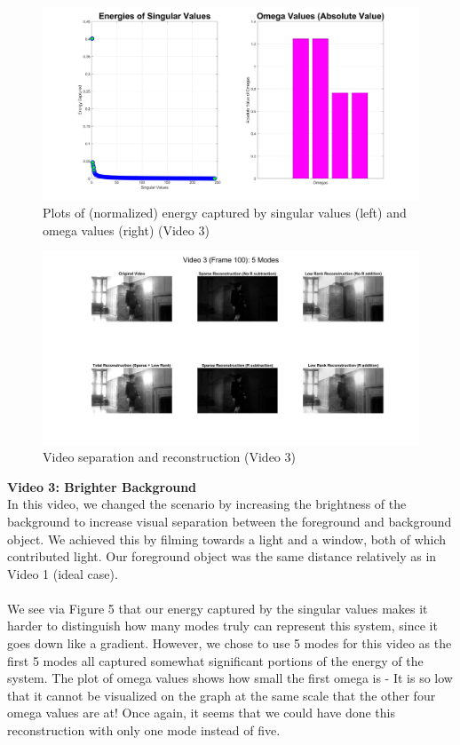 \documentclass{article}
\begin{document}
\begin{figure}[H]
\begin{center}
\includegraphics[width = 12cm]{energy3}
\caption{\label{fig:scaled_diss} Plots of (normalized) energy captured by singular values (left) and omega values (right) (Video 3)}
\end{center}
\end{figure}
\begin{figure}[H]
\begin{center}
\includegraphics[width = 16cm]{vid3image}
\caption{\label{fig:scaled_diss} Video separation and reconstruction (Video 3)}
\end{center}
\end{figure}
\textbf{Video 3: Brighter Background} \\
In this video, we changed the scenario by increasing the brightness of the background to increase visual separation between the foreground and background object. We achieved this by filming towards a light and a window, both of which contributed light. Our foreground object was the same distance relatively as in Video 1 (ideal case). \\ \\
We see via Figure 5 that our energy captured by the singular values makes it harder to distinguish how many modes truly can represent this system, since it goes down like a gradient. However, we chose to use 5 modes for this video as the first 5 modes all captured somewhat significant portions of the energy of the system. The plot of omega values shows how small the first omega is - It is so low that it cannot be visualized on the graph at the same scale that the other four omega values are at! Once again, it seems that we could have done this reconstruction with only one mode instead of five. \\ \\
\end{document}
